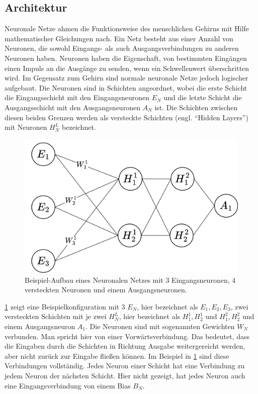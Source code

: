 \subsection{Architektur}
Neuronale Netze ahmen die Funktionsweise des menschlichen Gehirns mit Hilfe mathematischer Gleichungen nach.
Ein Netz besteht aus einer Anzahl von Neuronen, die sowohl Eingangs- als auch Ausgangsverbindungen zu anderen Neuronen haben.
Neuronen haben die Eigenschaft, von bestimmten Eingängen einen Impuls an die Ausgänge zu senden, wenn ein Schwellenwert überschritten wird.
Im Gegensatz zum Gehirn sind normale neuronale Netze jedoch logischer aufgebaut.
Die Neuronen sind in Schichten angeordnet, wobei die erste Schicht die Eingangsschicht mit den Eingangsneuronen $E_N$ und die letzte Schicht die Ausgangsschicht mit den Ausgangsneuronen $A_N$ ist.
Die Schichten zwischen diesen beiden Grenzen werden als versteckte Schichten (engl. \enquote{Hidden Layers}) mit Neuronen $H^L_N$ bezeichnet.\\

\begin{figure}
    \centering
    \includegraphics[width=\textwidth]{zeichnungen/nn_black.pdf}
    \caption[Beispiel-Aufbau eines Neuronalen Netzes]{Beispiel-Aufbau eines Neuronalen Netzes mit 3 Eingangsneuronen, 4 versteckten Neuronen und einem Ausgangsneuronen.}\label{nn_simple}
\end{figure}

\cref{nn_simple} zeigt eine Beispielkonfiguration mit 3 $E_N$, hier bezeichnet als $E_1,E_2,E_3$, zwei versteckten Schichten mit je zwei $H^L_N$, hier bezeichnet als $H^1_1, H^1_2$ und $H^2_1, H^2_2$ und einem Ausgangsneuron $A_1$.
Die Neuronen sind mit sogenannten Gewichten $W_N$ verbunden. Man spricht hier von einer Vorwärtsverbindung.
Das bedeutet, dass die Eingaben durch die Schichten in Richtung Ausgabe weitergereicht werden, aber nicht zurück zur Eingabe fließen können.
Im Beispiel in \cref{nn_simple} sind diese Verbindungen vollständig.
Jedes Neuron einer Schicht hat eine Verbindung zu jedem Neuron der nächsten Schicht.
Hier nicht gezeigt, hat jedes Neuron auch eine Eingangsverbindung von einem Bias $B_N$.

